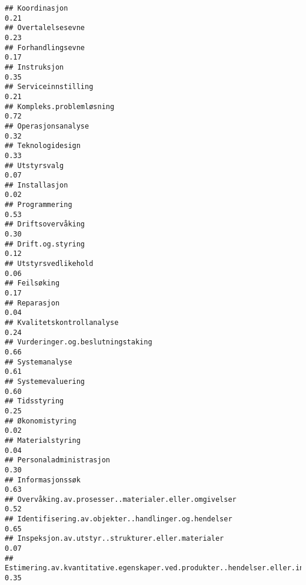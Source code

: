 \documentclass[
]{article}
\begin{document}
\begin{verbatim}
## Koordinasjon                                                                      0.21
## Overtalelsesevne                                                                  0.23
## Forhandlingsevne                                                                  0.17
## Instruksjon                                                                       0.35
## Serviceinnstilling                                                                0.21
## Kompleks.problemløsning                                                           0.72
## Operasjonsanalyse                                                                 0.32
## Teknologidesign                                                                   0.33
## Utstyrsvalg                                                                       0.07
## Installasjon                                                                      0.02
## Programmering                                                                     0.53
## Driftsovervåking                                                                  0.30
## Drift.og.styring                                                                  0.12
## Utstyrsvedlikehold                                                                0.06
## Feilsøking                                                                        0.17
## Reparasjon                                                                        0.04
## Kvalitetskontrollanalyse                                                          0.24
## Vurderinger.og.beslutningstaking                                                  0.66
## Systemanalyse                                                                     0.61
## Systemevaluering                                                                  0.60
## Tidsstyring                                                                       0.25
## Økonomistyring                                                                    0.02
## Materialstyring                                                                   0.04
## Personaladministrasjon                                                            0.30
## Informasjonssøk                                                                   0.63
## Overvåking.av.prosesser..materialer.eller.omgivelser                              0.52
## Identifisering.av.objekter..handlinger.og.hendelser                               0.65
## Inspeksjon.av.utstyr..strukturer.eller.materialer                                 0.07
## Estimering.av.kvantitative.egenskaper.ved.produkter..hendelser.eller.informasjon  0.35

\end{verbatim}
\end{document}
